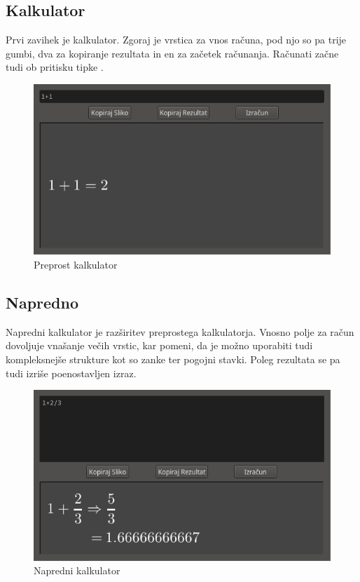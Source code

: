 \documentclass[12pt,titlepage]{report}
\begin{document}
		\parbox{\textwidth}{
		\subsection{Kalkulator}
			Prvi zavihek je  kalkulator.
			Zgoraj je vrstica za vnos računa, pod njo so pa trije gumbi, dva za kopiranje rezultata in en za začetek računanja.
			Računati začne tudi ob pritisku tipke .
			\begin{figure}[H]
				\centering
				\includegraphics{mw_calc.png}
				\caption{Preprost kalkulator}
				\label{fig:mw_calc}
			\end{figure}}
		\parbox{\textwidth}{
		\subsection{Napredno}
			Napredni kalkulator je razširitev preprostega kalkulatorja.
			Vnosno polje za račun dovoljuje vnašanje večih vrstic, kar pomeni, da je možno uporabiti tudi kompleksnejše strukture kot so zanke ter pogojni stavki.
			Poleg rezultata se pa tudi izriše poenostavljen izraz.
			\begin{figure}[H]
				\centering
				\includegraphics{mw_adv.png}
				\caption{Napredni kalkulator}
				\label{fig:mw_adv}
			\end{figure}}
\end{document}
